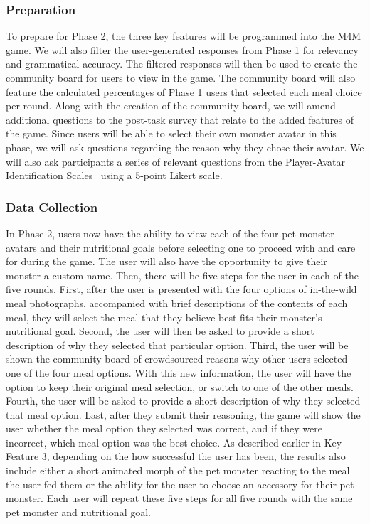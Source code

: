 \subsubsection{Preparation}

To prepare for Phase 2, the three key features will be programmed into the M4M game.
We will also filter the user-generated responses from Phase 1 for relevancy and grammatical accuracy. 
The filtered responses will then be used to create the community board for users to view in the game. 
The community board will also feature the calculated percentages of Phase 1 users that selected each meal choice per round.
Along with the creation of the community board, we will amend additional questions to the post-task survey that relate to the added features of the game. 
Since users will be able to select their own monster avatar in this phase, we will ask questions regarding the reason why they chose their avatar. 
We will also ask participants a series of relevant questions from the Player-Avatar Identification Scales~\cite{li2013player} using a 5-point Likert scale. 

\subsubsection{Data Collection}


In Phase 2, users now have the ability to view each of the four pet monster avatars and their nutritional goals before selecting one to proceed with and care for during the game. The user will also have the opportunity to give their monster a custom name. 
Then, there will be five steps for the user in each of the five rounds. 
First, after the user is presented with the four options of in-the-wild meal photographs, accompanied with brief descriptions of the contents of each meal, they will select the meal that they believe best fits their monster’s nutritional goal.  
Second, the user will then be asked to provide a short description of why they selected that particular option. 
Third, the user will be shown the community board of crowdsourced reasons why other users selected one of the four meal options. With this new information, the user will have the option to keep their original meal selection, or switch to one of the other meals.
Fourth, the user will be asked to provide a short description of why they selected that meal option.
Last, after they submit their reasoning, the game will show the user whether the meal option they selected was correct, and if they were incorrect, which meal option was the best choice. 
As described earlier in Key Feature 3, depending on the how successful the user has been, the results also include either a short animated morph of the pet monster reacting to the meal the user fed them or the ability for the user to choose an accessory for their pet monster.
Each user will repeat these five steps for all five rounds with the same pet monster and nutritional goal.

